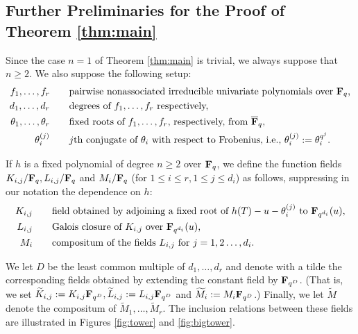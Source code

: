 \documentclass[a4paper]{compositio}
\begin{document}
\subsection{Further Preliminaries for the Proof of Theorem \ref{thm:main}}
Since the case $n=1$ of Theorem \ref{thm:main} is trivial, we always
suppose that $n \geq 2$. We also suppose the following setup:
\begin{alignat*}{1}
f_1, \dots, f_r &\qquad\text{pairwise nonassociated irreducible
univariate polynomials over $\mathbf{F}_q$,} \\
d_1, \dots, d_r &\qquad \text{degrees of $f_1, \dots, f_r$
respectively,} \\
\theta_1, \dots, \theta_r &\qquad \text{fixed roots of $f_1, \dots,
f_r$, respectively, from $\overline{\mathbf{F}}_q$,} \\
\theta_i^{(j)} &\qquad \text{$j$th conjugate of $\theta_i$ with
respect to Frobenius, i.e., $\theta_i^{(j)}:= \theta_i^{q^j}$.}
\end{alignat*}

If $h$ is a fixed polynomial of degree $n\geq 2$ over $\mathbf{F}_q$, we
define the function fields $K_{i,j}/\mathbf{F}_q, L_{i,j}/\mathbf{F}_q$ and
$M_i/\mathbf{F}_q$ (for $1 \leq i \leq r, 1 \leq j \leq d_i$) as follows,
suppressing in our notation the dependence on $h$:
\begin{alignat*}{1}
K_{i,j} &\qquad\text{field obtained by adjoining a fixed root of
$h(T) - u - \theta_i^{(j)}$ to $\mathbf{F}_{q^{d_i}}(u)$,} \\
L_{i,j} &\qquad \text{Galois closure of $K_{i,j}$ over
$\mathbf{F}_{q^{d_i}}(u)$,} \\
M_i &\qquad \text{compositum of the fields $L_{i,j}$ for $j=1, 2
\dots, d_i$.}
\end{alignat*}

We let $D$ be the least common multiple of $d_1, \dots, d_r$ and
denote with a tilde the corresponding fields obtained by extending
the constant field by $\mathbf{F}_{q^D}$. (That is, we set
$\widetilde{K}_{i,j}:= K_{i,j}\mathbf{F}_{q^D}, \widetilde{L}_{i,j}:=
L_{i,j} \mathbf{F}_{q^D}$ and $\widetilde{M}_i:=M_i \mathbf{F}_{q^D}$.) Finally, we
let $\widetilde{M}$ denote the compositum of $\widetilde{M}_1,
\dots, \widetilde{M}_r$. The inclusion relations between these
fields are illustrated in Figures \ref{fig:tower} and
\ref{fig:bigtower}.
\end{document}
